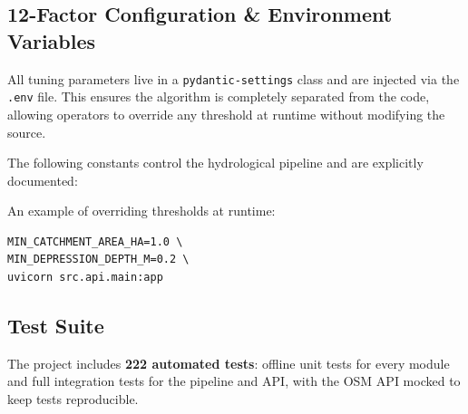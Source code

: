 \documentclass[12pt,a4paper]{article}
\begin{document}
\subsection{12-Factor Configuration \& Environment Variables}
All tuning parameters live in a \texttt{pydantic-settings} class and are injected via
the \texttt{.env} file. This ensures the algorithm is completely separated from the code,
allowing operators to override any threshold at runtime without modifying the source.

The following constants control the hydrological pipeline and are explicitly documented:

\begin{table}[H]
\centering
\caption{Pipeline Configuration Constants (\texttt{.env})}
\end{table}

An example of overriding thresholds at runtime:
\begin{lstlisting}[style=bash]
MIN_CATCHMENT_AREA_HA=1.0 \
MIN_DEPRESSION_DEPTH_M=0.2 \
uvicorn src.api.main:app
\end{lstlisting}

\subsection{Test Suite}
The project includes \textbf{222 automated tests}: offline unit tests for every module
and full integration tests for the pipeline and API, with the OSM API mocked to keep
tests reproducible.
\end{document}
